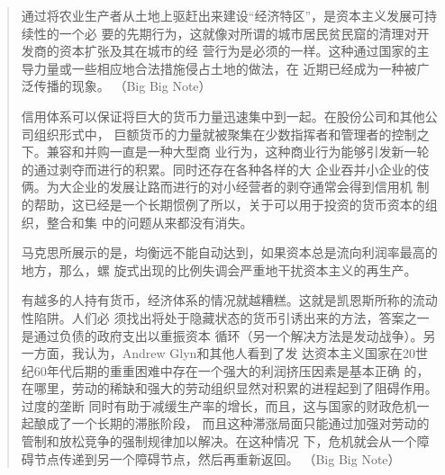 \begin{quotation}
通过将农业生产者从土地上驱赶出来建设“经济特区”，是资本主义发展可持续性的一个必
要的先期行为，这就像对所谓的城市居民贫民窟的清理对开发商的资本扩张及其在城市的经
营行为是必须的一样。这种通过国家的主导力量或一些相应地合法措施侵占土地的做法，在
近期已经成为一种被广泛传播的现象。 （Big Big
Note）

信用体系可以保证将巨大的货币力量迅速集中到一起。在股份公司和其他公司组织形式中，
巨额货币的力量就被聚集在少数指挥者和管理者的控制之下。兼容和并购一直是一种大型商
业行为，这种商业行为能够引发新一轮的通过剥夺而进行的积累。同时还存在各种各样的大
企业吞并小企业的伎俩。为大企业的发展让路而进行的对小经营者的剥夺通常会得到信用机
制的帮助，这已经是一个长期惯例了所以，关于可以用于投资的货币资本的组织，整合和集
中的问题从来都没有消失。

马克思所展示的是，均衡远不能自动达到，如果资本总是流向利润率最高的地方，那么，螺
旋式出现的比例失调会严重地干扰资本主义的再生产。

有越多的人持有货币，经济体系的情况就越糟糕。这就是凯恩斯所称的流动性陷阱。人们必
须找出将处于隐藏状态的货币引诱出来的方法，答案之一是通过负债的政府支出以重振资本
循环（另一个解决方法是发动战争）。另一方面，我认为，Andrew Glyn和其他人看到了发
达资本主义国家在20世纪60年代后期的重重困难中存在一个强大的利润挤压因素是基本正确
的，在哪里，劳动的稀缺和强大的劳动组织显然对积累的进程起到了阻碍作用。过度的垄断
同时有助于减缓生产率的增长，而且，这与国家的财政危机一起酿成了一个长期的滞胀阶段，
而且这种滞涨局面只能通过加强对劳动的管制和放松竞争的强制规律加以解决。在这种情况
下，危机就会从一个障碍节点传递到另一个障碍节点，然后再重新返回。
 （Big Big Note）

\end{quotation}


